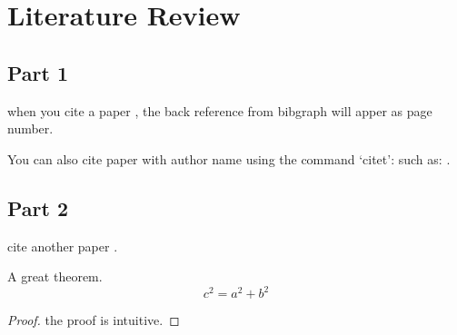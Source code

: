 
\chapter{Literature Review} %
\label{ch:literature_review} %


\section{Part 1}

when you cite a paper \cite{bauschke2011convex}, the back reference from bibgraph will apper as page number.

You can also cite paper with author name using the command `citet': such as: \citet{bauschke2011convex}.

\section{Part 2}

cite another paper \cite{DynamicOptim_Opportunities_challenges}.

\begin{theorem}[My theorem]
	A great theorem.
	\begin{equation}
		c^2=a^2+b^2
	\end{equation}
\end{theorem}

\begin{proof}
	the proof is intuitive.
\end{proof}
